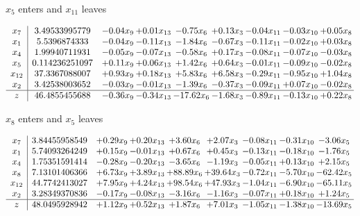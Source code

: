 \documentclass[8pt]{article}
\begin{document}
 $ x_{5} $ enters and $ x_{11} $ leaves 

 \[\begin{array}{c| c c@{\hskip 2pt} c@{\hskip 2pt} c@{\hskip 2pt} c@{\hskip 2pt} c@{\hskip 2pt} c@{\hskip 2pt} c@{\hskip 2pt} }
 x_{7}   &  3.49533995779 & -0.04 x_{9} & +  0.01 x_{13} & -0.75 x_{6} & +  0.13 x_{3} & -0.04 x_{11} & -0.03 x_{10} & +  0.05 x_{8}\\
 x_{1}   &  5.5396874333 & -0.04 x_{9} & -0.11 x_{13} & -1.84 x_{6} & -0.67 x_{3} & -0.11 x_{11} & -0.02 x_{10} & +  0.03 x_{8}\\
 x_{4}   &  1.99940711931 & -0.05 x_{9} & -0.07 x_{13} & -0.58 x_{6} & +  0.17 x_{3} & -0.08 x_{11} & -0.07 x_{10} & -0.03 x_{8}\\
 x_{5}   &  0.114236251097 & +  0.11 x_{9} & +  0.06 x_{13} & +  1.42 x_{6} & +  0.64 x_{3} & -0.01 x_{11} & -0.09 x_{10} & -0.02 x_{8}\\
 x_{12}   &  37.3367088007 & +  0.93 x_{9} & +  0.18 x_{13} & +  5.83 x_{6} & +  6.58 x_{3} & -0.29 x_{11} & -0.95 x_{10} & +  1.04 x_{8}\\
 x_{2}   &  3.42538003652 & -0.03 x_{9} & -0.01 x_{13} & -1.39 x_{6} & -0.37 x_{3} & -0.09 x_{11} & +  0.07 x_{10} & -0.02 x_{8}\\
\hline
z    &  46.4855455688 & -0.36 x_{9} & -0.34 x_{13} & -17.62 x_{6} & -1.68 x_{3} & -0.89 x_{11} & -0.13 x_{10} & +  0.22 x_{8}\\
\end{array}\]


 $ x_{8} $ enters and $ x_{5} $ leaves 

 \[\begin{array}{c| c c@{\hskip 2pt} c@{\hskip 2pt} c@{\hskip 2pt} c@{\hskip 2pt} c@{\hskip 2pt} c@{\hskip 2pt} c@{\hskip 2pt} }
 x_{7}   &  3.84455958549 & +  0.29 x_{9} & +  0.20 x_{13} & +  3.60 x_{6} & +  2.07 x_{3} & -0.08 x_{11} & -0.31 x_{10} & -3.06 x_{5}\\
 x_{1}   &  5.74093264249 & +  0.15 x_{9} & -0.01 x_{13} & +  0.67 x_{6} & +  0.45 x_{3} & -0.13 x_{11} & -0.18 x_{10} & -1.76 x_{5}\\
 x_{4}   &  1.75351591414 & -0.28 x_{9} & -0.20 x_{13} & -3.65 x_{6} & -1.19 x_{3} & -0.05 x_{11} & +  0.13 x_{10} & +  2.15 x_{5}\\
 x_{8}   &  7.13101406366 & +  6.73 x_{9} & +  3.89 x_{13} & + 88.89 x_{6} & + 39.64 x_{3} & -0.72 x_{11} & -5.70 x_{10} & -62.42 x_{5}\\
 x_{12}   &  44.7742413027 & +  7.95 x_{9} & +  4.24 x_{13} & + 98.54 x_{6} & + 47.93 x_{3} & -1.04 x_{11} & -6.90 x_{10} & -65.11 x_{5}\\
 x_{2}   &  3.28349370836 & -0.17 x_{9} & -0.08 x_{13} & -3.16 x_{6} & -1.16 x_{3} & -0.07 x_{11} & +  0.18 x_{10} & +  1.24 x_{5}\\
\hline
z    &  48.0495928942 & +  1.12 x_{9} & +  0.52 x_{13} & +  1.87 x_{6} & +  7.01 x_{3} & -1.05 x_{11} & -1.38 x_{10} & -13.69 x_{5}\\
\end{array}\]
\end{document}
